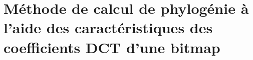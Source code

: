 \documentclass[utf8,final]{stageM2R} %
\begin{document}





\chapter{Méthode de calcul de phylogénie à l'aide des caractéristiques des coefficients DCT d'une bitmap}
\label{chap3}
\end{document}
